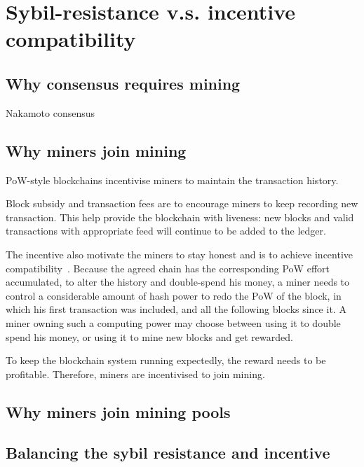 \section{Sybil-resistance v.s. incentive compatibility}

\subsection{Why consensus requires mining}

Nakamoto consensus


\subsection{Why miners join mining}

PoW-style blockchains incentivise miners to maintain the transaction history.

Block subsidy and transaction fees are to encourage miners to keep recording new transaction.
This help provide the blockchain with liveness: new blocks and valid transactions with appropriate feed will continue to be added to the ledger.

The incentive also motivate the miners to stay honest and is to achieve incentive compatibility~\cite{}.
Because the agreed chain has the corresponding PoW effort accumulated, to alter the history and double-spend his money, a miner needs to control a considerable amount of hash power to redo the PoW of the block, in which his first transaction was included, and all the following blocks since it.
A miner owning such a computing power may choose between using it to double spend his money, or using it to mine new blocks and get rewarded. 

To keep the blockchain system running expectedly, the reward needs to be profitable.
Therefore, miners are incentivised to join mining.

\subsection{Why miners join mining pools}



\subsection{Balancing the sybil resistance and incentive}

